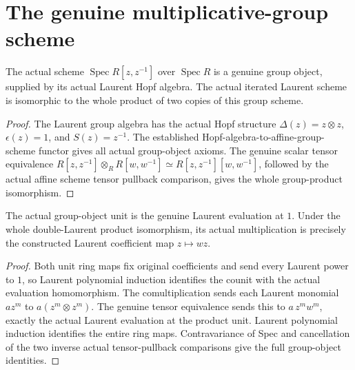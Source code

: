 \section{The genuine multiplicative-group scheme}

\begin{definition}
\label{def:native-multiplicative-group}
\leanok
The actual scheme $\operatorname{Spec}R[z,z^{-1}]$ over
$\operatorname{Spec}R$ is a genuine group object, supplied by its actual
Laurent Hopf algebra.  The actual iterated Laurent scheme is isomorphic
to the whole product of two copies of this group scheme.
\end{definition}
\begin{proof}
The Laurent group algebra has the actual Hopf structure
$\Delta(z)=z\otimes z$, $\epsilon(z)=1$, and $S(z)=z^{-1}$.
The established Hopf-algebra-to-affine-group-scheme functor gives all
actual group-object axioms.  The genuine scalar tensor equivalence
$R[z,z^{-1}]\otimes_R R[w,w^{-1}]
\simeq R[z,z^{-1}][w,w^{-1}]$, followed by the actual affine scheme
tensor pullback comparison, gives the whole group-product isomorphism.
\end{proof}

\begin{lemma}
\label{lem:native-multiplicative-group-coordinate-laws}
\leanok
The actual group-object unit is the genuine Laurent evaluation at $1$.
Under the whole double-Laurent product isomorphism, its actual
multiplication is precisely the constructed Laurent
coefficient map $z\mapsto wz$.
\end{lemma}
\begin{proof}
Both unit ring maps fix original coefficients and send every Laurent
power to $1$, so Laurent polynomial induction identifies the counit
with the actual evaluation homomorphism.  The comultiplication sends
each Laurent monomial $az^m$ to $a(z^m\otimes z^m)$.
The genuine tensor equivalence sends this to
$a\,z^m w^m$, exactly the actual Laurent evaluation at the product unit.
Laurent polynomial induction identifies the entire ring maps.
Contravariance of Spec and cancellation of the two inverse actual
tensor-pullback comparisons give the full group-object identities.
\end{proof}
